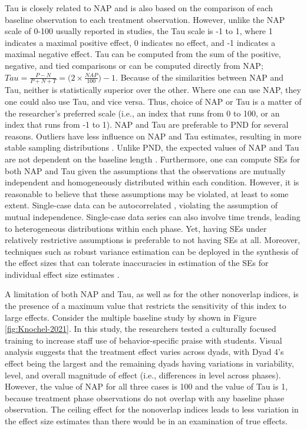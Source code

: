 \documentclass[
]{book}
\begin{document}
Tau is closely related to NAP and is also based on the comparison of each baseline observation to each treatment observation. However, unlike the NAP scale of 0-100 usually reported in studies, the Tau scale is -1 to 1, where 1 indicates a maximal positive effect, 0 indicates no effect, and -1 indicates a maximal negative effect. Tau can be computed from the sum of the positive, negative, and tied comparisons or can be computed directly from NAP; \(Tau = \frac{P-N}{P+N+T} = \big(2\times \frac{NAP}{100} \big)-1.\) Because of the similarities between NAP and Tau, neither is statistically superior over the other. Where one can use NAP, they one could also use Tau, and vice versa. Thus, choice of NAP or Tau is a matter of the researcher's preferred scale (i.e., an index that runs from 0 to 100, or an index that runs from -1 to 1).
NAP and Tau are preferable to PND for several reasons. Outliers have less influence on NAP and Tau estimates, resulting in more stable sampling distributions \citep{Parker_Vannest_2009}. Unlike PND, the expected values of NAP and Tau are not dependent on the baseline length \citep{Pustejovsky2019Procedural}. Furthermore, one can compute SEs for both NAP and Tau given the assumptions that the observations are mutually independent and homogeneously distributed within each condition. However, it is reasonable to believe that these assumptions may be violated, at least to some extent. Single-case data can be autocorrelated \citep{matyas1997Serial, Shadish_Sullivan_2011}, violating the assumption of mutual independence. Single-case data series can also involve time trends, leading to heterogeneous distributions within each phase. Yet, having SEs under relatively restrictive assumptions is preferable to not having SEs at all. Moreover, techniques such as robust variance estimation can be deployed in the synthesis of the effect sizes that can tolerate inaccuracies in estimation of the SEs for individual effect size estimates \citep{Chen_Pustejovsky_2022}.

A limitation of both NAP and Tau, as well as for the other nonoverlap indices, is the presence of a maximum value that restricts the sensitivity of this index to large effects. Consider the multiple baseline study by \citet{knochel2021culturally} shown in Figure \ref{fig:Knochel-2021}. In this study, the researchers tested a culturally focused training to increase staff use of behavior-specific praise with students. Visual analysis suggests that the treatment effect varies across dyads, with Dyad 4's effect being the largest and the remaining dyads having variations in variability, level, and overall magnitude of effect (i.e., differences in level across phases). However, the value of NAP for all three cases is 100 and the value of Tau is 1, because treatment phase observations do not overlap with any baseline phase observation. The ceiling effect for the nonoverlap indices leads to less variation in the effect size estimates than there would be in an examination of true effects.
\end{document}
